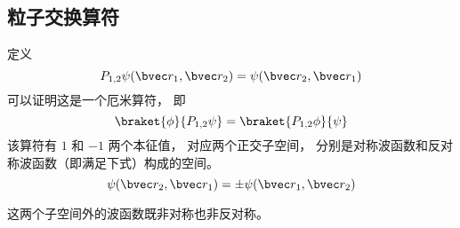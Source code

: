 
\subsection{粒子交换算符}

定义
\begin{equation}
P_{1,2}\psi(\bvec r_1, \bvec r_2) = \psi(\bvec r_2, \bvec r_1)
\end{equation}
可以证明这是一个厄米算符， 即
\begin{equation}
\braket{\phi}{P_{1,2}\psi} = \braket{P_{1,2}\phi}{\psi}
\end{equation}
该算符有 $1$ 和 $-1$ 两个本征值， 对应两个正交子空间， 分别是对称波函数和反对称波函数（即满足下式）构成的空间。
\begin{equation}
\psi(\bvec r_2, \bvec r_1) = \pm\psi(\bvec r_1, \bvec r_2)
\end{equation}


这两个子空间外的波函数既非对称也非反对称。

